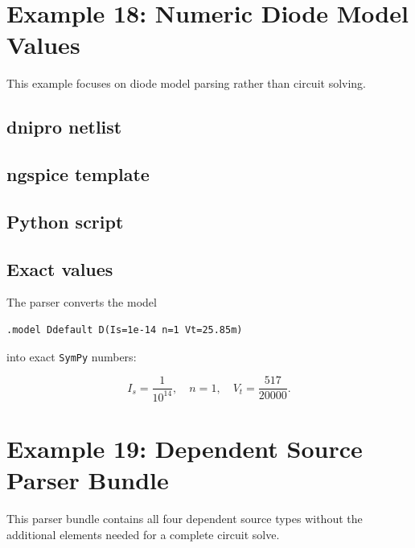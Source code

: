 \documentclass[11pt,a4paper]{article}
\newcommand{\sympy}{\texttt{SymPy}}
\begin{document}
\section{Example 18: Numeric Diode Model Values}
\label{sec:ex-diode-model-values}

This example focuses on diode model parsing rather than circuit solving.

\subsection{dnipro netlist}



\subsection{ngspice template}



\subsection{Python script}



\subsection{Exact values}

The parser converts the model

\begin{lstlisting}[style=spice]
.model Ddefault D(Is=1e-14 n=1 Vt=25.85m)
\end{lstlisting}

into exact \sympy{} numbers:

\begin{equation}
    I_s = \frac{1}{10^{14}}, \quad n = 1, \quad V_t = \frac{517}{20000}.
\end{equation}

\section{Example 19: Dependent Source Parser Bundle}
\label{sec:ex-dependent-parser-bundle}

This parser bundle contains all four dependent source types without the
additional elements needed for a complete circuit solve.
\end{document}
